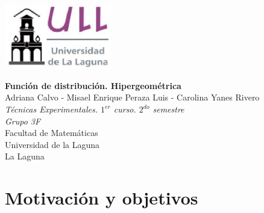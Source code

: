 \documentclass[spanish,a4paper,12pt]{report}
\begin{document}
\begin{center}
\includegraphics[width=0.35\textwidth]{logoULL.eps}\\[2mm]
\end{center}


\begin{center}

  {\textbf{\huge{Función de distribución. Hipergeométrica}}}\\[10mm]
  {\Large Adriana Calvo - Misael Enrique Peraza Luis - Carolina Yanes Rivero}\\[3.5mm]
  \textit{Técnicas Experimentales. $1^{er}$ curso. $2^{do}$ semestre}\\[2.5mm]
  \textit{Grupo 3F}\\[2.5mm]
  {Facultad de Matemáticas}\\[2.5mm]
  {Universidad de la Laguna}\\[2.5mm]
  {La Laguna \Today}

\end{center}


\renewcommand{\thepage}{\roman{page}}
\setcounter{page}{1}

\newpage
\begin{abstract}
El propósito de esta exposición consiste en describir de manera objetiva los distintos procedimientos y herramientas utilizadas para llevar a cabo la implementación de la función de distribución de la variable aleatoria hipergeométrica en Python. 

El objetivo principal de este proyecto consiste en aprender a manejar un lenguaje de programación denominado Python, además de usarlo como una herramienta básica en el ámbito matemático. En este trabajo también se encuentran otros objetivos como el de familiarizarse con $\LaTeX$ y Beamer, herramientas básicas en la redacción y exposición de informes y proyectos.
\end{abstract}

\pagebreak

\tableofcontents
\pagebreak

\renewcommand{\thepage}{\arabic{page}}
\setcounter{page}{1}

\chapter{\textbf Motivación y objetivos}
\end{document}
